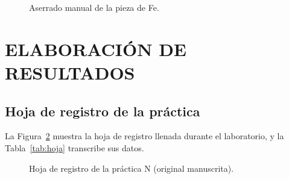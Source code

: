 \documentclass[12pt,a4paper]{article}
\begin{document}
\begin{figure}[H]
	\centering
	\caption{Aserrado manual de la pieza de Fe.}\label{fig:proceso}
\end{figure}

\section{ELABORACIÓN DE RESULTADOS}\label{sec:resultados}

\subsection{Hoja de registro de la práctica}

La Figura~\ref{fig:hoja} muestra la hoja de registro llenada durante el
laboratorio, y la Tabla~\ref{tab:hoja} transcribe sus datos.

\begin{figure}[H]
	\centering
	\caption{Hoja de registro de la práctica N (original
		manuscrita).}\label{fig:hoja}
\end{figure}
\end{document}
